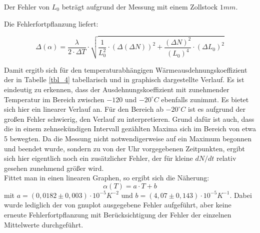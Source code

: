 Der Fehler von $ L_{0} $ beträgt aufgrund der Messung mit einem Zollstock $ 1 mm $.

Die Fehlerfortpflanzung liefert:

\begin{equation}
\Delta (\alpha) = \frac{\lambda}{2 \cdot \Delta T} \cdot \sqrt{\frac{1}{L_{0}^{2}} \cdot (\Delta(\Delta N))^{2} + \frac{(\Delta N)^{2}}{(L_{0})^{4}} \cdot (\Delta L_{0})^{2}}
\end{equation}


Damit ergitb sich für den temperaturabhängigen Wärmeausdehnungskoeffizient der in Tabelle \ref{tbl_4} tabellarisch und in 
graphisch dargestellte Verlauf. Es ist eindeutig zu erkennen, dass der Ausdehnungskoeffizient mit zunehmender Temperatur 
im Bereich zwischen $ -120 $ und $ - 20 ^{\circ} C $ ebenfalls zunimmt. Es bietet sich hier ein linearer Verlauf an.
Für den Bereich ab $ -20 ^{\circ} C $ ist es aufgrund der großen Fehler schwierig, den Verlauf zu interpretieren. Grund 
dafür ist auch, dass die in einem zehnsekündigen Intervall gezählten Maxima sich im Bereich von etwa 5 bewegten. Da die
Messung nicht notwendigerweise auf ein Maximum begonnen und beendet wurde, sondern zu von der Uhr vorgegebenen Zeitpunkten,
ergibt sich hier eigentlich noch ein zusätzlicher Fehler, der für kleine $dN/dt$ relativ gesehen 
zunehmend größer wird. \\
Fittet man in  einen linearen Graphen, so ergibt sich die Näherung:
\begin{equation}
\alpha(T) = a \cdot T + b 
\end{equation}
mit $ a = (0,0182 \pm 0,003) \cdot 10^{-5} K^{-2} $ und $ b = (4,07 \pm 0,143) \cdot 10^{-5} K^{-1} $. Dabei wurde lediglich
der von gnuplot ausgegebene Fehler aufgeführt, aber keine erneute Fehlerfortpflanzung mit Berücksichtigung der Fehler der einzelnen
Mittelwerte durchgeführt. 

